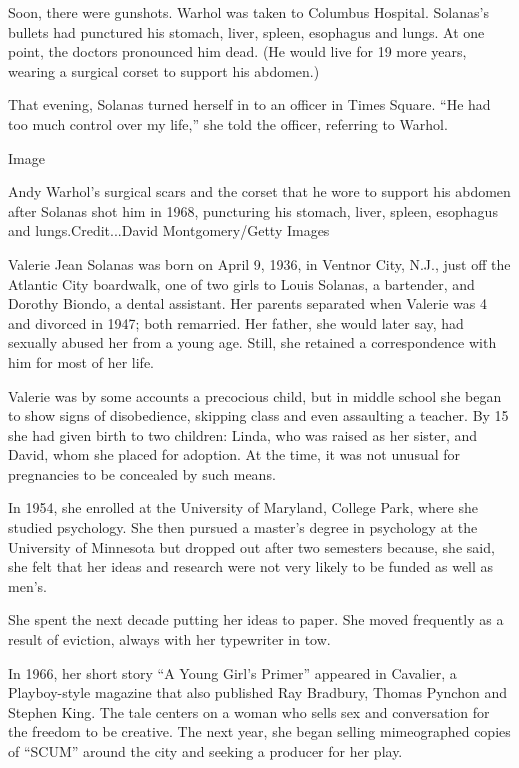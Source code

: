 Soon, there were gunshots. Warhol was taken to Columbus Hospital.
Solanas's bullets had punctured his stomach, liver, spleen, esophagus
and lungs. At one point, the doctors pronounced him dead. (He would live
for 19 more years, wearing a surgical corset to support his abdomen.)

That evening, Solanas turned herself in to an officer in Times Square.
``He had too much control over my life,'' she told the officer,
referring to Warhol.

Image

Andy Warhol's surgical scars and the corset that he wore to support his
abdomen after Solanas shot him in 1968, puncturing his stomach, liver,
spleen, esophagus and lungs.Credit...David Montgomery/Getty Images

Valerie Jean Solanas was born on April 9, 1936, in Ventnor City, N.J.,
just off the Atlantic City boardwalk, one of two girls to Louis Solanas,
a bartender, and Dorothy Biondo, a dental assistant. Her parents
separated when Valerie was 4 and divorced in 1947; both remarried. Her
father, she would later say, had sexually abused her from a young age.
Still, she retained a correspondence with him for most of her life.

Valerie was by some accounts a precocious child, but in middle school
she began to show signs of disobedience, skipping class and even
assaulting a teacher. By 15 she had given birth to two children: Linda,
who was raised as her sister, and David, whom she placed for adoption.
At the time, it was not unusual for pregnancies to be concealed by such
means.

In 1954, she enrolled at the University of Maryland, College Park, where
she studied psychology. She then pursued a master's degree in psychology
at the University of Minnesota but dropped out after two semesters
because, she said, she felt that her ideas and research were not very
likely to be funded as well as men's.

She spent the next decade putting her ideas to paper. She moved
frequently as a result of eviction, always with her typewriter in tow.

In 1966, her short story ``A Young Girl's Primer'' appeared in Cavalier,
a Playboy-style magazine that also published Ray Bradbury, Thomas
Pynchon and Stephen King. The tale centers on a woman who sells sex and
conversation for the freedom to be creative. The next year, she began
selling mimeographed copies of ``SCUM'' around the city and seeking a
producer for her play.

